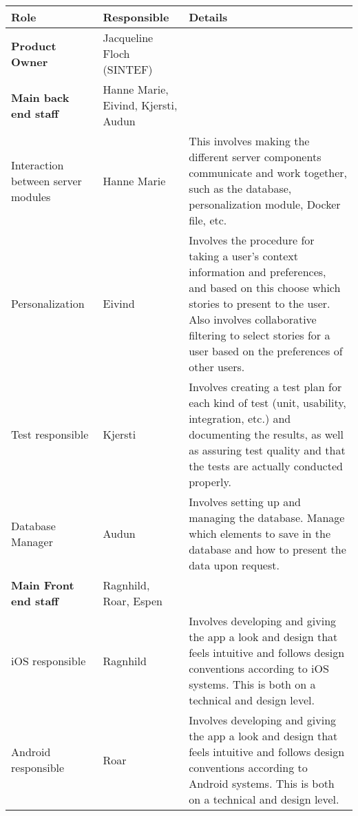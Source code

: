 \begin{table}[!h]
	\small
	\centering
		\begin{tabular}{ | p{3.7cm} | p{2.8cm} | p{10.5cm} |}
			\hline
			\textbf{Role} & \textbf{Responsible} & \textbf{Details} \\ \hline
			
			\textbf{Product Owner} & Jacqueline Floch (SINTEF) & \\ \hline
			
			\textbf{Main back end staff} & Hanne Marie, Eivind, Kjersti, Audun & \\ \hline
			
			Interaction between server modules & Hanne Marie & This involves making the different server components communicate and work together, such as the database, personalization module, Docker file, etc. \\ \hline
			
			Personalization & Eivind & Involves the procedure for taking a user’s context information and preferences, and based on this choose which stories to present to the user. Also involves collaborative filtering to select stories for a user based on the preferences of other users. \\ \hline
			
			Test responsible & Kjersti & Involves creating a test plan for each kind of test (unit, usability, integration, etc.) and documenting the results, as well as assuring test quality and that the tests are actually conducted properly. \\ \hline
			
			Database Manager & Audun & Involves setting up and managing the database. Manage which elements to save in the database and how to present the data upon request. \\ \hline
			
			\textbf{Main Front end staff} & Ragnhild, Roar, Espen & \\ \hline
			
			iOS responsible & Ragnhild & Involves developing and giving the app a look and design that feels intuitive and follows design conventions according to iOS systems. This is both on a technical and design level. \\ \hline
			
			Android responsible & Roar & Involves developing and giving the app a look and design that feels intuitive and follows design conventions according to Android systems. This is both on a  technical and design level. \\ \hline
			

\end{tabular}
\end{table}

